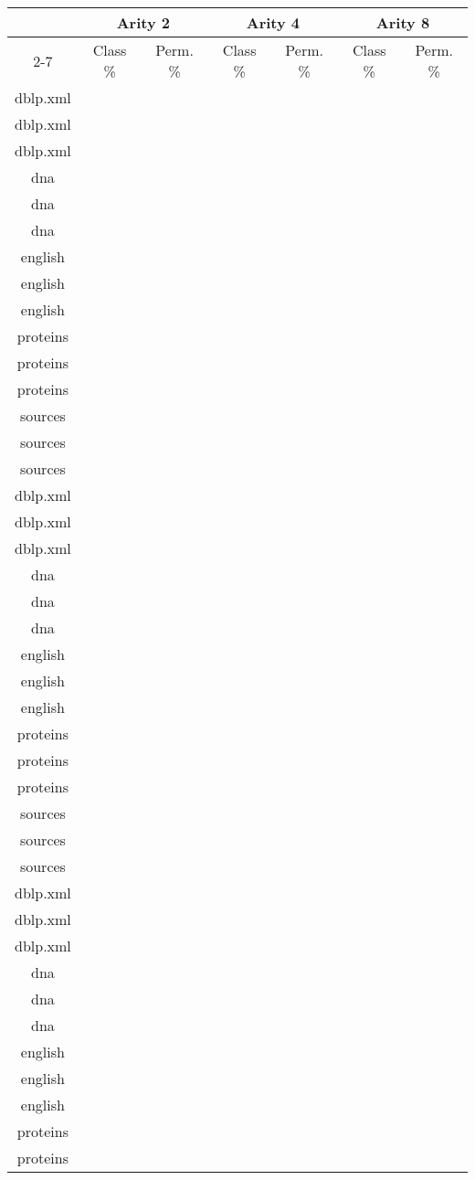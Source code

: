 \begin{table}[h]
\begin{center}
\begin{tabular}{crrrrrr}
\toprule
 & \multicolumn{2}{c}{Arity 2} & \multicolumn{2}{c}{Arity 4} & \multicolumn{2}{c}{Arity 8} \\
\cmidrule(r){2-7}
 & \multicolumn{1}{c}{Class \%} & \multicolumn{1}{c}{Perm. \%}
 & \multicolumn{1}{c}{Class \%} & \multicolumn{1}{c}{Perm. \%}
 & \multicolumn{1}{c}{Class \%} & \multicolumn{1}{c}{Perm. \%}\\
\midrule
dblp.xml \\
dblp.xml \\
dblp.xml \\
dna \\
dna \\
dna \\
english \\
english \\
english \\
proteins \\
proteins \\
proteins \\
sources \\
sources \\
sources \\
dblp.xml \\
dblp.xml \\
dblp.xml \\
dna \\
dna \\
dna \\
english \\
english \\
english \\
proteins \\
proteins \\
proteins \\
sources \\
sources \\
sources \\
dblp.xml \\
dblp.xml \\
dblp.xml \\
dna \\
dna \\
dna \\
english \\
english \\
english \\
proteins \\
proteins \\

\end{tabular}
\end{center}
\end{table}
